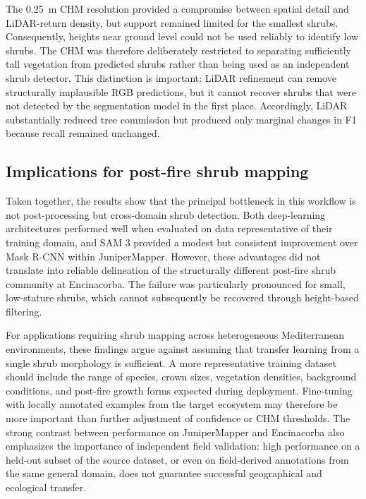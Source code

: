 \documentclass[12pt,a4paper]{article}
\begin{document}
The \qty{0.25}{\metre} CHM resolution provided a compromise between spatial detail and LiDAR-return density, but support remained limited for the smallest shrubs. Consequently, heights near ground level could not be used reliably to identify low shrubs. The CHM was therefore deliberately restricted to separating sufficiently tall vegetation from predicted shrubs rather than being used as an independent shrub detector. This distinction is important: LiDAR refinement can remove structurally implausible RGB predictions, but it cannot recover shrubs that were not detected by the segmentation model in the first place. Accordingly, LiDAR substantially reduced tree commission but produced only marginal changes in F1 because recall remained unchanged.

\subsection{Implications for post-fire shrub mapping}

Taken together, the results show that the principal bottleneck in this workflow is not post-processing but cross-domain shrub detection. Both deep-learning architectures performed well when evaluated on data representative of their training domain, and SAM 3 provided a modest but consistent improvement over Mask R-CNN within JuniperMapper. However, these advantages did not translate into reliable delineation of the structurally different post-fire shrub community at Encinacorba. The failure was particularly pronounced for small, low-stature shrubs, which cannot subsequently be recovered through height-based filtering.

For applications requiring shrub mapping across heterogeneous Mediterranean environments, these findings argue against assuming that transfer learning from a single shrub morphology is sufficient. A more representative training dataset should include the range of species, crown sizes, vegetation densities, background conditions, and post-fire growth forms expected during deployment. Fine-tuning with locally annotated examples from the target ecosystem may therefore be more important than further adjustment of confidence or CHM thresholds. The strong contrast between performance on JuniperMapper and Encinacorba also emphasizes the importance of independent field validation: high performance on a held-out subset of the source dataset, or even on field-derived annotations from the same general domain, does not guarantee successful geographical and ecological transfer.
\end{document}
